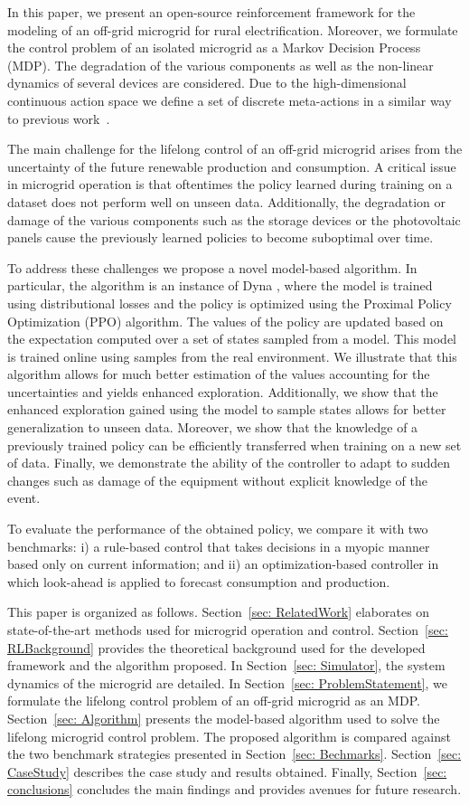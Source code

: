 \documentclass{article}
\begin{document}
	In this paper, we present an open-source reinforcement framework for the modeling of an off-grid microgrid for rural electrification. Moreover, we formulate the control problem of an isolated microgrid as a Markov Decision Process (MDP). The degradation of the various components as well as the non-linear dynamics of several devices are considered. Due to the high-dimensional continuous action space we define a set of discrete meta-actions in a similar way to previous work~\cite{Boukas2018}.

	The main challenge for the lifelong control of an off-grid microgrid arises from the uncertainty of the future renewable production and consumption. A critical issue in microgrid operation is that oftentimes the policy learned during training on a dataset does not perform well on unseen data. Additionally, the degradation or damage of the various components such as the storage devices or the photovoltaic panels cause the previously learned policies to become suboptimal over time.

	To address these challenges we propose a novel model-based algorithm. In particular, the algorithm is an instance of Dyna \cite{sutton2012dyna}, where the model is trained using distributional losses and the policy is optimized using the Proximal Policy Optimization (PPO) algorithm. The values of the policy are updated based on the expectation computed over a set of states sampled from a model. This model is trained online using samples from the real environment. We illustrate that this algorithm allows for much better estimation of the values accounting for the uncertainties and yields enhanced exploration. Additionally, we show that the enhanced exploration gained using the model to sample states allows for better generalization to unseen data. Moreover, we show that the knowledge of a previously trained policy can be efficiently transferred when training on a new set of data. Finally, we demonstrate the ability of the controller to adapt to sudden changes such as damage of the equipment without explicit knowledge of the event. 

	To evaluate the performance of the obtained policy, we compare it with two benchmarks: i) a rule-based control that takes decisions in a myopic manner based only on current information; and ii) an optimization-based controller in which look-ahead is applied to forecast consumption and production.

	This paper is organized as follows. Section~\ref{sec: RelatedWork} elaborates on state-of-the-art methods used for microgrid operation and control. Section~\ref{sec: RLBackground} provides the theoretical background used for the developed framework and the algorithm proposed. In Section~\ref{sec: Simulator}, the system dynamics of the microgrid are detailed. In Section~\ref{sec: ProblemStatement}, we formulate the lifelong control problem of an off-grid microgrid as an MDP. Section~\ref{sec: Algorithm} presents the model-based algorithm used to solve the lifelong microgrid control problem. The proposed algorithm is compared against the two benchmark strategies presented in Section~\ref{sec: Bechmarks}. Section~\ref{sec: CaseStudy} describes the case study and results obtained. Finally, Section~\ref{sec: conclusions} concludes the main findings and provides avenues for future research.
\end{document}
